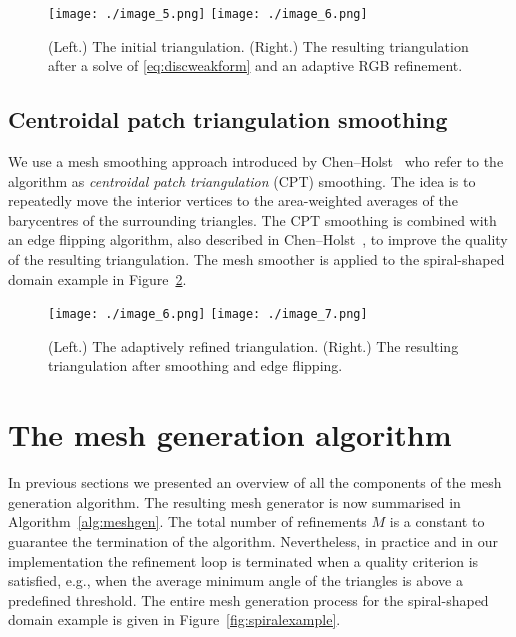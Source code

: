 \documentclass[12pt]{rmstyle}
\begin{document}
\begin{figure}[htbp]
\centering
\texttt{[image: ./image\_5.png]}
\texttt{[image: ./image\_6.png]}
\caption{(Left.) The initial triangulation. (Right.) The resulting triangulation
  after a solve of \eqref{eq:discweakform} and an adaptive RGB refinement.}
\label{fig:firstrgb}
\end{figure}

\subsection{Centroidal patch triangulation smoothing}
\label{sec:cpt}

We use a mesh smoothing approach introduced by Chen--Holst~\cite{Chen_2011} who
refer to the algorithm as \emph{centroidal patch triangulation} (CPT) smoothing.
The idea is to repeatedly move the interior vertices to the area-weighted
averages of the barycentres of the surrounding triangles.  The CPT smoothing is
combined with an edge flipping algorithm, also described in
Chen--Holst~\cite{Chen_2011}, to improve the quality of the resulting
triangulation.  The mesh smoother is applied to the spiral-shaped domain example 
in Figure~\ref{fig:firstsmooth}.

\begin{figure}[htbp]
\centering
\texttt{[image: ./image\_6.png]}
\texttt{[image: ./image\_7.png]}
\caption{(Left.) The adaptively refined triangulation. (Right.) The resulting
  triangulation after smoothing and edge flipping.}
\label{fig:firstsmooth}
\end{figure}

\section{The mesh generation algorithm}
\label{sec:orgff9b6c1}

In previous sections we presented an overview of all the components of the mesh
generation algorithm.  The resulting mesh generator is now summarised in
Algorithm~\ref{alg:meshgen}.  The total number of refinements $M$ is a constant
to guarantee the termination of the algorithm.  Nevertheless, in
practice and in our implementation the refinement loop is terminated when a
quality criterion is satisfied, e.g., when the average minimum angle of the
triangles is above a predefined threshold.  The entire mesh generation process
for the spiral-shaped domain example is given in Figure~\ref{fig:spiralexample}.
\end{document}
